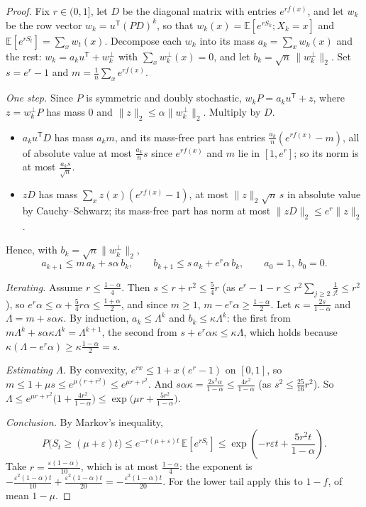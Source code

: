 \begin{proof}
Fix $r\in(0,1]$, let $D$ be the diagonal matrix with entries $e^{rf(x)}$, and let $w_k$ be the row vector $w_k=u^{\mathsf T}(PD)^k$, so that $w_k(x)=\mathbb E[e^{rS_k};X_k=x]$ and $\mathbb E[e^{rS_t}]=\sum_xw_t(x)$. Decompose each $w_k$ into
its mass $a_k=\sum_xw_k(x)$ and the rest: $w_k=a_ku^{\mathsf T}+w_k^\perp$ with $\sum_xw_k^\perp(x)=0$, and let $b_k=\sqrt n\,\|w_k^\perp\|_2$. Set $s=e^r-1$ and $m=\frac1n\sum_xe^{rf(x)}$.

\emph{One step.} Since $P$ is symmetric and doubly stochastic, $w_kP=a_ku^{\mathsf T}+z$, where $z=w_k^\perp P$ has mass $0$ and $\|z\|_2\le\alpha\|w_k^\perp\|_2$. Multiply by $D$.
\begin{itemize}
\item $a_ku^{\mathsf T}D$ has mass $a_km$, and its mass-free part has entries $\frac{a_k}n(e^{rf(x)}-m)$, all of absolute value at most $\frac{a_k}ns$ since $e^{rf(x)}$ and $m$ lie in $[1,e^r]$; so its norm is at most $\frac{a_ks}{\sqrt n}$.
\item $zD$ has mass $\sum_xz(x)(e^{rf(x)}-1)$, at most $\|z\|_2\sqrt n\,s$ in absolute value by Cauchy--Schwarz; its mass-free part has norm at most $\|zD\|_2\le e^r\|z\|_2$.
\end{itemize}
Hence, with $b_k=\sqrt n\|w_k^\perp\|_2$,
\[
a_{k+1}\le m\,a_k+s\alpha\,b_k,\qquad b_{k+1}\le s\,a_k+e^r\alpha\,b_k,\qquad a_0=1,\ b_0=0.
\]

\emph{Iterating.} Assume $r\le\frac{1-\alpha}4$. Then $s\le r+r^2\le\frac54r$ (as $e^r-1-r\le r^2\sum_{j\ge2}\frac1{j!}\le r^2$), so $e^r\alpha\le\alpha+\frac54r\alpha\le\frac{1+\alpha}2$, and since $m\ge1$, $m-e^r\alpha\ge\frac{1-\alpha}2$. Let
$\kappa=\frac{2s}{1-\alpha}$ and $\Lambda=m+s\alpha\kappa$. By induction, $a_k\le\Lambda^k$ and $b_k\le\kappa\Lambda^k$: the first from $m\Lambda^k+s\alpha\kappa\Lambda^k=\Lambda^{k+1}$, the second from
$s+e^r\alpha\kappa\le\kappa\Lambda$, which holds because $\kappa(\Lambda-e^r\alpha)\ge\kappa\frac{1-\alpha}2=s$.

\emph{Estimating $\Lambda$.} By convexity, $e^{rx}\le1+x(e^r-1)$ on $[0,1]$, so $m\le1+\mu s\le e^{\mu(r+r^2)}\le e^{\mu r+r^2}$. And $s\alpha\kappa=\frac{2s^2\alpha}{1-\alpha}\le\frac{4r^2}{1-\alpha}$ (as $s^2\le\frac{25}{16}r^2$). So
$\Lambda\le e^{\mu r+r^2}\bigl(1+\frac{4r^2}{1-\alpha}\bigr)\le\exp\bigl(\mu r+\frac{5r^2}{1-\alpha}\bigr)$.

\emph{Conclusion.} By Markov's inequality,
\[
P\bigl(S_t\ge(\mu+\varepsilon)t\bigr)\le e^{-r(\mu+\varepsilon)t}\,\mathbb E[e^{rS_t}]\le\exp\left(-r\varepsilon t+\frac{5r^2t}{1-\alpha}\right).
\]
Take $r=\frac{\varepsilon(1-\alpha)}{10}$, which is at most $\frac{1-\alpha}4$: the exponent is $-\frac{\varepsilon^2(1-\alpha)t}{10}+\frac{\varepsilon^2(1-\alpha)t}{20}=-\frac{\varepsilon^2(1-\alpha)t}{20}$. For the lower tail apply this to $1-f$, of mean $1-\mu$.
\end{proof}

